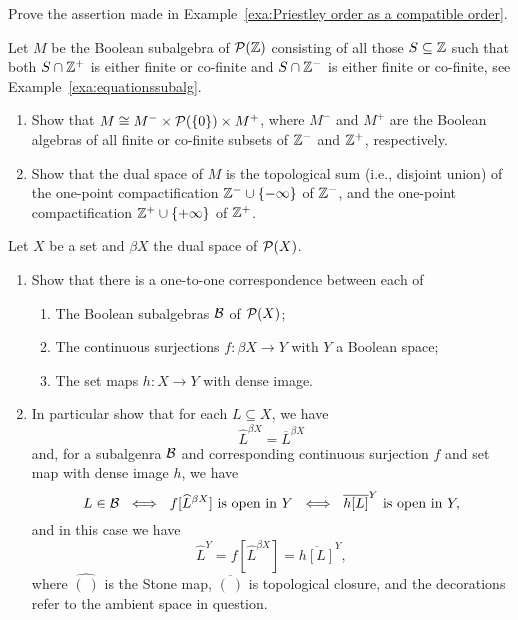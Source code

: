 \begin{exercise}
Prove the assertion made in Example~\ref{exa:Priestley order as a compatible order}.
\end{exercise}

\begin{exercise}\label{exe:equationssubalg}
Let $M$ be the Boolean subalgebra of $\mathcal{P}(\mathbb{Z})$ consisting of all those $S\subseteq\mathbb{Z}$ such that both $S\cap\mathbb{Z}^+$ is either finite or co-finite and $S\cap\mathbb{Z}^-$ is either finite or co-finite, see Example~\ref{exa:equationssubalg}.
\begin{enumerate}
\item Show that $M\cong M^-\times\mathcal{P}(\{0\})\times M^+$, where $M^-$ and $M^+$ are the Boolean algebras of all finite or co-finite subsets of $\mathbb{Z}^-$ and $\mathbb{Z}^+$, respectively. 
\item Show that the dual space of $M$ is the topological sum (i.e., disjoint union) of the one-point compactification $\mathbb{Z}^-\cup\{-\infty\}$ of $\mathbb{Z}^-$, and the one-point compactification $\mathbb{Z}^+\cup\{+\infty\}$ of $\mathbb{Z}^+$.
 \end{enumerate}
\end{exercise}

\begin{exercise}\label{exe:quotbeta}
Let $X$ be a set and $\beta X$ the dual space of $\mathcal{P}(X)$. 
\begin{enumerate}
\item Show that there is a one-to-one correspondence between each of
\begin{enumerate}
\item The Boolean subalgebras $\mathcal{B}$ of $\mathcal{P}(X)$;
\item The continuous surjections $f\colon\beta X\to Y$ with $Y$ a Boolean space; 
\item The set maps $h\colon X\to Y$ with dense image.
\end{enumerate}
\item In particular show that for each $L\subseteq X$, we have 
\[
\widehat{L}^{\beta X}=\overline{L}^{\beta X}
\]
and, for a subalgenra $\mathcal{B}$ and corresponding continuous surjection $f$ and set map with dense image $h$, we have 
\[
L\in\mathcal{B}\ \iff\ f[\widehat{L}^{\beta X}]\text{ is open in }Y\ \iff\ \overline{h[L]}^Y\text{  is open in }Y,
\]
and in this case we have
\[
\widehat{L}^{Y}=f[\widehat{L}^{\beta X}]=\overline{h[L]}^Y,
\]
where $\widehat{(\ )}$ is the Stone map, $\overline{(\ )}$ is topological closure, and the decorations refer to the ambient space in question.
\end{enumerate}
\end{exercise}

